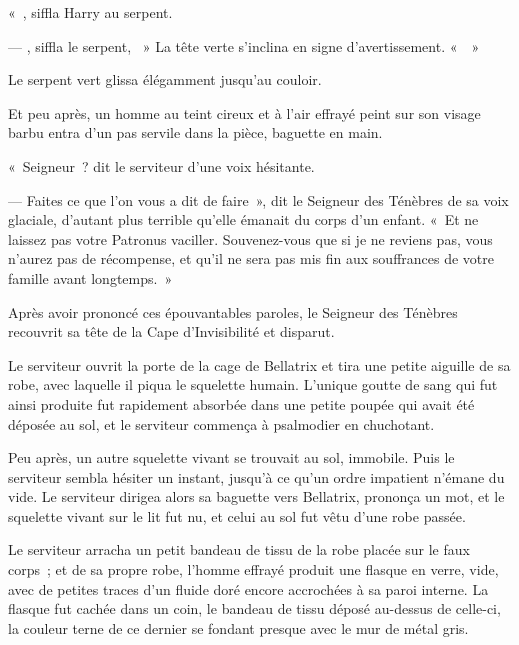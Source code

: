 «~, siffla Harry au serpent.

--- , siffla le serpent, ~» La tête verte s'inclina en signe d'avertissement.
«~~»

Le serpent vert glissa élégamment jusqu'au couloir.

Et peu après, un homme au teint cireux et à l'air effrayé peint sur son visage barbu entra d'un pas servile dans la pièce, baguette en main.

«~Seigneur~? dit le serviteur d'une voix hésitante.

--- Faites ce que l'on vous a dit de faire~», dit le Seigneur des Ténèbres de sa voix glaciale, d'autant plus terrible qu'elle émanait du corps d'un enfant.
«~Et ne laissez pas votre Patronus vaciller.
Souvenez-vous que si je ne reviens pas, vous n'aurez pas de récompense, et qu'il ne sera pas mis fin aux souffrances de votre famille avant longtemps.~»

Après avoir prononcé ces épouvantables paroles, le Seigneur des Ténèbres recouvrit sa tête de la Cape d'Invisibilité et disparut.

Le serviteur ouvrit la porte de la cage de Bellatrix et tira une petite aiguille de sa robe, avec laquelle il piqua le squelette humain.
L'unique goutte de sang qui fut ainsi produite fut rapidement absorbée dans une petite poupée qui avait été déposée au sol, et le serviteur commença à psalmodier en chuchotant.

Peu après, un autre squelette vivant se trouvait au sol, immobile.
Puis le serviteur sembla hésiter un instant, jusqu'à ce qu'un ordre impatient n'émane du vide.
Le serviteur dirigea alors sa baguette vers Bellatrix, prononça un mot, et le squelette vivant sur le lit fut nu, et celui au sol fut vêtu d'une robe passée.

Le serviteur arracha un petit bandeau de tissu de la robe placée sur le faux corps~; et de sa propre robe, l'homme effrayé produit une flasque en verre, vide, avec de petites traces d'un fluide doré encore accrochées à sa paroi interne.
La flasque fut cachée dans un coin, le bandeau de tissu déposé au-dessus de celle-ci, la couleur terne de ce dernier se fondant presque avec le mur de métal gris.

